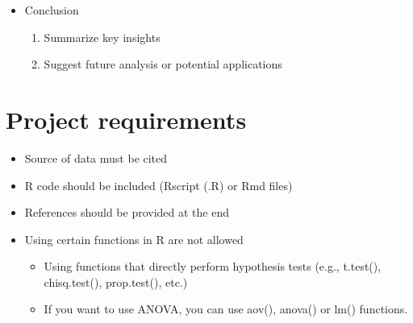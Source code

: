 \documentclass[12pt]{article}
\begin{document}
\begin{itemize}
\begin{enumerate}
\begin{enumerate}
            \end{enumerate}
            \item Inference for Numerical Data
        \begin{enumerate}
            \item Conditions of inference
            \item Hypoetheses
            \item Test statistic and p-value
            \item Conclusion : Discuss results in context of the data
        \end{enumerate}
    \end{enumerate}
    \item Conclusion
    \begin{enumerate}
            \item Summarize key insights
            \item Suggest future analysis or potential applications
        \end{enumerate} 
\end{itemize}

\section*{Project requirements}
\begin{itemize}
    \item Source of data must be cited
    \item R code should be included (Rscript (.R) or Rmd files)
    \item References should be provided at the end
    \item Using certain functions in R are not allowed
    \begin{itemize}
        \item Using functions that directly perform hypothesis tests (e.g., t.test(), chisq.test(), prop.test(), etc.)
        \item If you want to use ANOVA, you can use aov(), anova() or lm() functions.
    \end{itemize}
\end{itemize}
\end{document}
